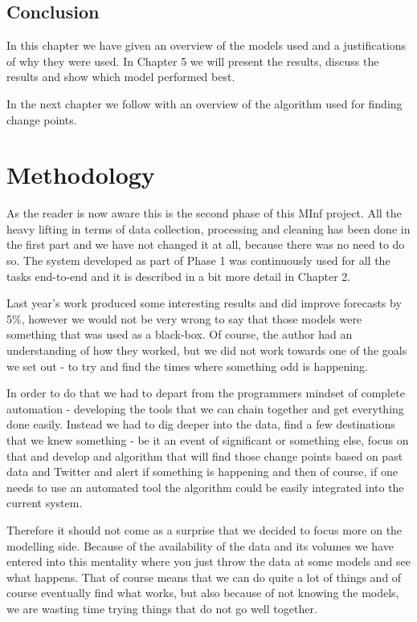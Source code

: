 \documentclass[minf,twoside,singlespacing,parskip,frontabs,notimes,12pt]{infthesis} %
\begin{document}
\section{Conclusion}

In this chapter we have given an overview of the models used and a justifications of why they were used. In Chapter 5 we will present the results, discuss the results and show which model performed best.

In the next chapter we follow with an overview of the algorithm used for finding change points.        

\chapter{Methodology}

As the reader is now aware this is the second phase of this MInf project. All the heavy lifting in terms of data collection, processing and cleaning has been done in the first part and we have not changed it at all, because there was no need to do so. The system developed as part of Phase 1 was continuously used for all the tasks end-to-end and it is described in a bit more detail in Chapter 2. 

Last year's work produced some interesting results and did improve forecasts by 5\%, however we would not be very wrong to say that those models were something that was used as a black-box. Of course, the author had an understanding of how they worked, but we did not work towards one of the goals we set out - to try and find the times where something odd is happening.

In order to do that we had to depart from the programmers mindset of complete automation - developing the tools that we can chain together and get everything done easily. Instead we had to dig deeper into the data, find a few destinations that we knew something - be it an event of significant or something else, focus on that and develop and algorithm that will find those change points based on past data and Twitter and alert if something is happening and then of course, if one needs to use an automated tool the algorithm could be easily integrated into the current system.

Therefore it should not come as a surprise that we decided to focus more on the modelling side. Because of the availability of the data and its volumes we have entered into this mentality where you just throw the data at some models and see what happens. That of course means that we can do quite a lot of things and of course eventually find what works, but also because of not knowing the models, we are wasting time trying things that do not go well together. 
\end{document}
